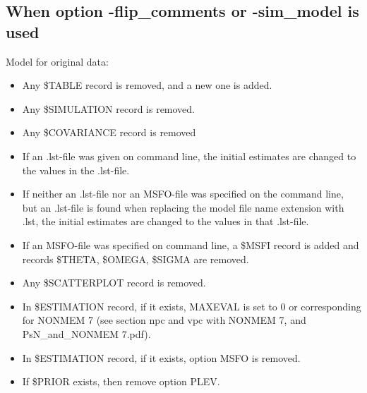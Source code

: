\subsection{When option -flip\_comments or -sim\_model is used}
Model for original data:  
\begin{itemize}
	\item Any \$TABLE record is removed, and a new one is added.
	\item Any \$SIMULATION record is removed.
	\item Any \$COVARIANCE record is removed
	\item If an .lst-file was given on command line, the initial estimates are changed to the values in the .lst-file. 
	\item If neither an .lst-file nor an MSFO-file was specified on the command line, but an .lst-file is found when replacing the model file name extension with .lst, the initial estimates are changed to the values in that .lst-file.
	\item If an MSFO-file was specified on command line, a \$MSFI record is added and records \$THETA, \$OMEGA, \$SIGMA are removed.  
	\item Any \$SCATTERPLOT record is removed.
	\item In \$ESTIMATION record, if it exists, MAXEVAL is set to 0 or corresponding for  NONMEM 7 (see section npc and vpc with NONMEM 7, and PsN\_and\_NONMEM 7.pdf).
	\item In \$ESTIMATION record, if it exists, option MSFO is removed.
	\item If \$PRIOR exists, then remove option PLEV.
\end{itemize}

